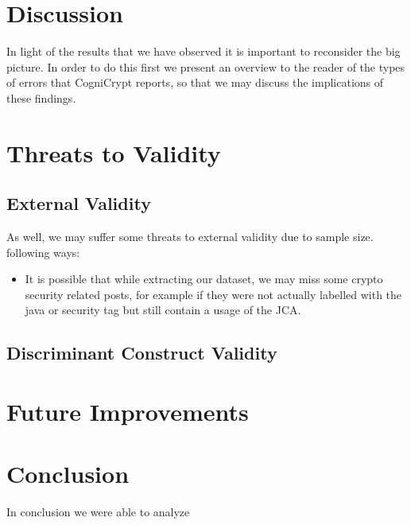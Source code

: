 \documentclass[10pt, conference]{IEEEtran}
\begin{document}
\section{Discussion}

In light of the results that we have observed it is important to reconsider the big picture. In order to do this first we present an overview to the reader of the types of errors that CogniCrypt reports, so that we may discuss the implications of these findings.

\section{Threats to Validity}

\subsection{External Validity}
As well, we may suffer some threats to external validity due to sample size.  following ways:

\begin{itemize}
\item
It is possible that while extracting our dataset, we may miss some crypto security related posts, for example if they were not actually labelled with the java or security tag but still contain a usage of the JCA. 


\end{itemize}

\subsection{Discriminant Construct Validity}



\section{Future Improvements}
 

\section{Conclusion}

In conclusion we were able to analyze 

\printbibliography
\end{document}
